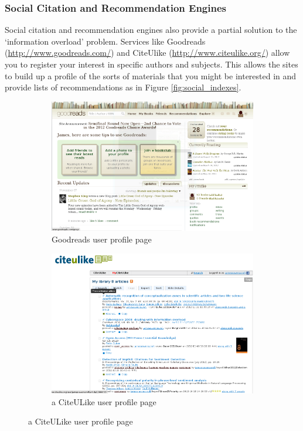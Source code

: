 \documentclass[12pt,a4paper]{article}
\begin{document}
\subsubsection{Social Citation and Recommendation Engines}
Social citation and recommendation engines also provide a partial solution to
the `information overload' problem.  Services like Goodreads
(\url{http://www.goodreads.com/}) and CiteUlike
(\url{http://www.citeulike.org/}) allow you to register your interest in
specific authors and subjects. This allows the sites to build up a profile of
the sorts of materials that you might be interested in and provide lists of
recommendations as in Figure \ref{fig:social_indexes}.

\begin{figure}[!hbt]
        \centering
        \begin{subfigure}[b]{0.50\textwidth}
                \centering
                \includegraphics[width=\textwidth]{images/goodreads_index.png}
                \caption{Goodreads user profile page}
                \label{fig:goodreads_index}
        \end{subfigure}%
        \begin{subfigure}[b]{0.50\textwidth}
                \centering
                \includegraphics[width=\textwidth]{images/citeulike_index.png}
                \caption{a CiteULike user profile page}
                \label{fig:citeulike_index}
        \end{subfigure}


\end{figure}
\end{document}
